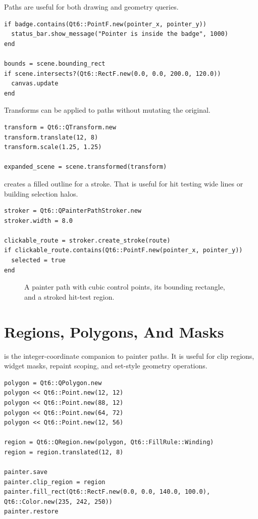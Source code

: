 Paths are useful for both drawing and geometry queries.

\begin{lstlisting}[style=crystal]
if badge.contains(Qt6::PointF.new(pointer_x, pointer_y))
  status_bar.show_message("Pointer is inside the badge", 1000)
end

bounds = scene.bounding_rect
if scene.intersects?(Qt6::RectF.new(0.0, 0.0, 200.0, 120.0))
  canvas.update
end
\end{lstlisting}

Transforms can be applied to paths without mutating the original.

\begin{lstlisting}[style=crystal]
transform = Qt6::QTransform.new
transform.translate(12, 8)
transform.scale(1.25, 1.25)

expanded_scene = scene.transformed(transform)
\end{lstlisting}

 creates a filled outline for a stroke. That is useful for hit testing wide lines or building selection halos.

\begin{lstlisting}[style=crystal]
stroker = Qt6::QPainterPathStroker.new
stroker.width = 8.0

clickable_route = stroker.create_stroke(route)
if clickable_route.contains(Qt6::PointF.new(pointer_x, pointer_y))
  selected = true
end
\end{lstlisting}

\begin{figure}[htbp]
  \centering
  \caption{A painter path with cubic control points, its bounding rectangle, and a stroked hit-test region.}
\end{figure}

\section{Regions, Polygons, And Masks}

 is the integer-coordinate companion to painter paths. It is useful for clip regions, widget masks, repaint scoping, and set-style geometry operations.

\begin{lstlisting}[style=crystal]
polygon = Qt6::QPolygon.new
polygon << Qt6::Point.new(12, 12)
polygon << Qt6::Point.new(88, 12)
polygon << Qt6::Point.new(64, 72)
polygon << Qt6::Point.new(12, 56)

region = Qt6::QRegion.new(polygon, Qt6::FillRule::Winding)
region = region.translated(12, 8)

painter.save
painter.clip_region = region
painter.fill_rect(Qt6::RectF.new(0.0, 0.0, 140.0, 100.0), Qt6::Color.new(235, 242, 250))
painter.restore
\end{lstlisting}

